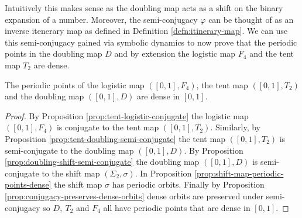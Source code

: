 Intuitively this makes sense as the doubling map acts as a shift on the binary expansion of a number. Moreover, the semi-conjugacy $\varphi$ can be thought of as an inverse itenerary map as defined in Definition \ref{defn:itinerary-map}. We can use this semi-conjugacy gained via symbolic dynamics to now prove that the periodic points in the doubling map $D$ and by extension the logistic map $F_4$ and the tent map $T_2$ are dense.

\begin{prop} \label{prop:logisitc-tent-doubling-periodic-dense}
    The periodic points of the logistic map $([0, 1], F_4)$, the tent map $([0, 1], T_2)$ and the doubling map $([0, 1], D)$ are dense in $[0, 1]$.
    \begin{proof}
    By Proposition \ref{prop:tent-logistic-conjugate} the logistic map $([0, 1], F_4)$ is conjugate to the tent map $([0, 1], T_2)$. Similarly, by Proposition \ref{prop:tent-doubling-semi-conjugate} the tent map $([0, 1], T_2)$ is semi-conjugate to the doubling map $([0, 1], D)$. By Proposition \ref{prop:doubling-shift-semi-conjugate} the doubling map $([0, 1], D)$ is semi-conjugate to the shift map $(\Sigma_2, \sigma)$. In Proposition \ref{prop:shift-map-periodic-points-dense} the shift map $\sigma$ has periodic orbits. Finally by Proposition \ref{prop:conjugacy-preserves-dense-orbits} dense orbits are preserved under semi-conjugacy so $D, \ T_2$ and $F_4$ all have periodic points that are dense in $[0, 1]$.
    \end{proof}
\end{prop}

\begin{center}
\end{center}

